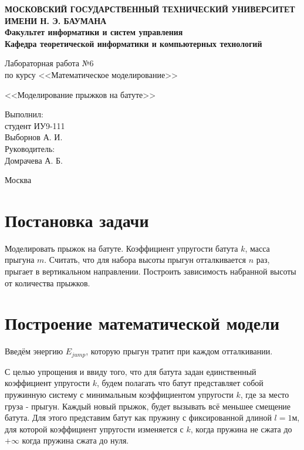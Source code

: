 \documentclass[12pt,a4paper,oneside]{extarticle}
\begin{document}
\pgfplotsset{compat=1.8}

\thispagestyle{empty}
\newpage
{
\centering


\textbf{
МОСКОВСКИЙ ГОСУДАРСТВЕННЫЙ ТЕХНИЧЕСКИЙ УНИВЕРСИТЕТ ИМЕНИ Н. Э. БАУМАНА \\
Факультет информатики и систем управления \\
Кафедра теоретической информатики и компьютерных технологий}
\bigskip
\bigskip
\bigskip
\bigskip
\bigskip
\bigskip
\bigskip

\vfill


Лабораторная работа №6 \\
по курсу <<Математическое моделирование>>

\bigskip

{\large <<Моделирование прыжков на батуте>>}
\bigskip

\vfill



\hfill\parbox{4cm} {
Выполнил:\\
студент ИУ9-111 \hfill \\
Выборнов А. И.\hfill \medskip\\
Руководитель:\\
Домрачева А. Б.\hfill
}


\vspace{\fill}

Москва \number\year
\clearpage
}



\clearpage  


\section{Постановка задачи}
    Моделировать прыжок на батуте. Коэффициент упругости батута $k$, масса прыгуна $m$. Считать, что для набора высоты прыгун отталкивается $n$ раз, прыгает в вертикальном направлении. Построить зависимость набранной высоты от количества прыжков.

\section{Построение математической модели}
\label{sec:model}
    Введём энергию $E_{jump}$, которую прыгун тратит при каждом отталкивании.

    С целью упрощения и ввиду того, что для батута задан единственный коэффициент упругости $k$, будем полагать что батут представляет собой пружинную систему с минимальным коэффициентом упругости $k$, где за место груза - прыгун. Каждый новый прыжок, будет вызывать всё меньшее смещение батута. Для этого представим батут как пружину с фиксированной длиной $l=1$м, для которой коэффициент упругости изменяется с $k$, когда пружина не сжата до $+\infty$ когда пружина сжата до нуля.
\end{document}
